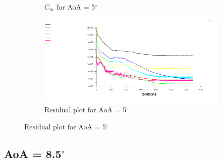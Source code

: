 \begin{figure}[H]
\begin{subfigure}[b]{0.5\textwidth}
    \caption{$C_m$ for AoA = 5$^\circ$}
    \label{fig:aoa_5_cm}
  \end{subfigure}
  \begin{subfigure}[b]{0.5\textwidth}
    \includegraphics[width=\textwidth]{5_deg/AoA_5_resid.png}
    \caption{Residual plot for AoA = 5$^\circ$}
    \label{fig:aoa_5_resid}
  \end{subfigure}
\end{figure}

\subsection*{AoA = 8.5$^\circ$}

